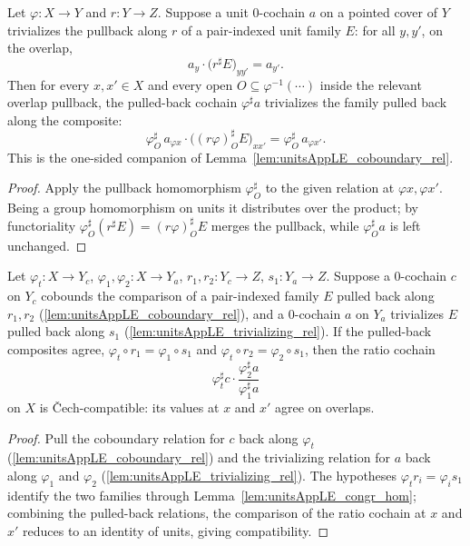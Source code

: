 \begin{lemma}
  \label{lem:unitsAppLE_trivializing_rel}
  \leanok
  Let \(\varphi \colon X \to Y\) and \(r \colon Y \to Z\). Suppose a unit \(0\)-cochain \(a\) on a
  pointed cover of \(Y\) trivializes the pullback along \(r\) of a pair-indexed unit family \(E\):
  for all \(y, y'\), on the overlap,
  \[
    a_y \cdot \bigl(r^{\sharp} E\bigr)_{y y'} = a_{y'} .
  \]
  Then for every \(x, x' \in X\) and every open \(O \subseteq \varphi^{-1}(\cdots)\) inside the
  relevant overlap pullback, the pulled-back cochain \(\varphi^{\sharp} a\) trivializes the family
  pulled back along the composite:
  \[
    \varphi^{\sharp}_O\, a_{\varphi x} \cdot \bigl((r\varphi)^{\sharp}_O E\bigr)_{x x'}
      = \varphi^{\sharp}_O\, a_{\varphi x'} .
  \]
  This is the one-sided companion of Lemma~\ref{lem:unitsAppLE_coboundary_rel}.
\end{lemma}
\begin{proof}
  \leanok
  Apply the pullback homomorphism \(\varphi^{\sharp}_O\) to the given relation at \(\varphi x,
  \varphi x'\). Being a group homomorphism on units it distributes over the product; by
  functoriality \(\varphi^{\sharp}_O(r^{\sharp} E) = (r\varphi)^{\sharp}_O E\) merges the pullback,
  while \(\varphi^{\sharp}_O a\) is left unchanged.
\end{proof}

\begin{lemma}
  \label{lem:unitsAppLE_trivializing_ratio_compat}
  \leanok
  Let \(\varphi_t \colon X \to Y_c\), \(\varphi_1, \varphi_2 \colon X \to Y_a\), \(r_1, r_2
  \colon Y_c \to Z\), \(s_1 \colon Y_a \to Z\). Suppose a \(0\)-cochain \(c\) on \(Y_c\) cobounds
  the comparison of a pair-indexed family \(E\) pulled back along \(r_1, r_2\)
  (\ref{lem:unitsAppLE_coboundary_rel}), and a \(0\)-cochain \(a\) on \(Y_a\) trivializes \(E\)
  pulled back along \(s_1\) (\ref{lem:unitsAppLE_trivializing_rel}). If the pulled-back composites
  agree, \(\varphi_t \circ r_1 = \varphi_1 \circ s_1\) and \(\varphi_t \circ r_2 = \varphi_2
  \circ s_1\), then the ratio cochain
  \[
    \varphi_t^{\sharp} c \cdot \frac{\varphi_2^{\sharp} a}{\varphi_1^{\sharp} a}
  \]
  on \(X\) is \v Cech-compatible: its values at \(x\) and \(x'\) agree on overlaps.
\end{lemma}
\begin{proof}
  \leanok
  Pull the coboundary relation for \(c\) back along \(\varphi_t\)
  (\ref{lem:unitsAppLE_coboundary_rel}) and the trivializing relation for \(a\) back along
  \(\varphi_1\) and \(\varphi_2\) (\ref{lem:unitsAppLE_trivializing_rel}). The hypotheses
  \(\varphi_t r_i = \varphi_i s_1\) identify the two families through
  Lemma~\ref{lem:unitsAppLE_congr_hom}; combining the pulled-back relations, the comparison of
  the ratio cochain at \(x\) and \(x'\) reduces to an identity of units, giving compatibility.
\end{proof}

